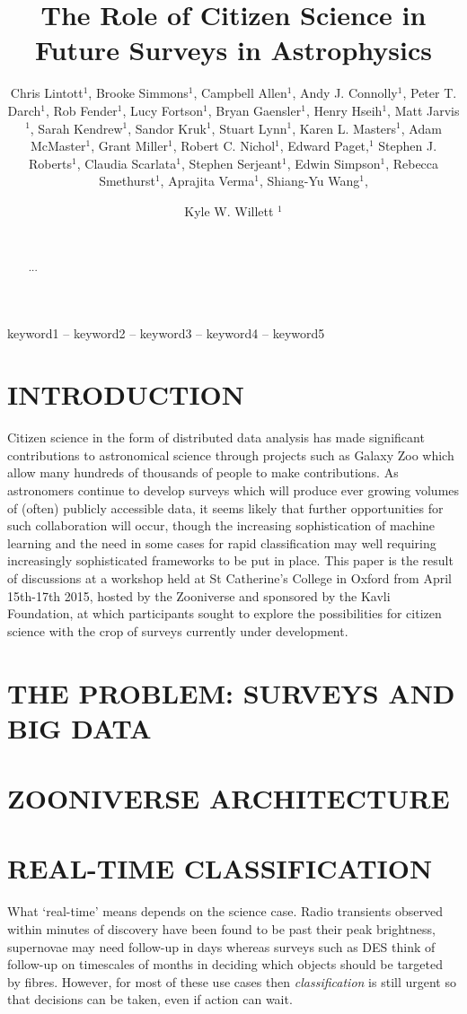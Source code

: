 \documentclass{pasa}
\title[Future Surveys and Citizen Science]{The Role of Citizen Science in Future Surveys in Astrophysics}
\author[Lintott et al.]{Chris Lintott$^1$, Brooke Simmons$^1$, Campbell Allen$^1$, Andy J. Connolly$^1$, Peter T. Darch$^1$, Rob Fender$^1$, Lucy Fortson$^1$, Bryan Gaensler$^1$, Henry Hseih$^1$, Matt Jarvis$^1$, Sarah Kendrew$^1$, Sandor Kruk$^1$, Stuart Lynn$^1$, Karen L. Masters$^1$, Adam McMaster$^1$, Grant Miller$^1$, Robert C. Nichol$^1$, Edward Paget,$^1$ Stephen J. Roberts$^1$, Claudia Scarlata$^1$, Stephen Serjeant$^1$, Edwin Simpson$^1$, Rebecca Smethurst$^1$, Aprajita Verma$^1$, Shiang-Yu Wang$^1$, \and Kyle W. Willett $^1$
\\ 
\\%
\affil{$^1$St. Catherine's College, Oxford University}}%
\begin{document}
%
%
\begin{abstract}

...

\end{abstract}
%
\begin{keywords}
keyword1 -- keyword2 -- keyword3 -- keyword4 -- keyword5
\end{keywords}
%
\maketitle%
%
\section{INTRODUCTION }
\label{sec:intro}

Citizen science in the form of distributed data analysis has made significant contributions to astronomical science through projects such as Galaxy Zoo which allow many hundreds of thousands of people to make contributions. As astronomers continue to develop surveys which will produce ever growing volumes of (often) publicly accessible data, it seems likely that further opportunities for such collaboration will occur, though the increasing sophistication of machine learning and the need in some cases for rapid classification may well requiring increasingly sophisticated frameworks to be put in place. This paper is the result of discussions at a workshop held at St Catherine's College in Oxford from April 15th-17th 2015, hosted by the Zooniverse and sponsored by the Kavli Foundation, at which participants sought to explore the possibilities for citizen science with the crop of surveys currently under development. 

\section{THE PROBLEM: SURVEYS AND BIG DATA }
\label{sec:problem}

\section{ZOONIVERSE ARCHITECTURE}
\label{sec:zoo}

\section{REAL-TIME CLASSIFICATION}
\label{sec:realtime}

What `real-time' means depends on the science case. Radio transients observed within minutes of discovery have been found to be past their peak brightness, supernovae may need follow-up in days whereas surveys such as DES think of follow-up on timescales of months in deciding which objects should be targeted by fibres. However, for most of these use cases then \emph{classification} is still urgent so that decisions can be taken, even if action can wait. 
\end{document}
